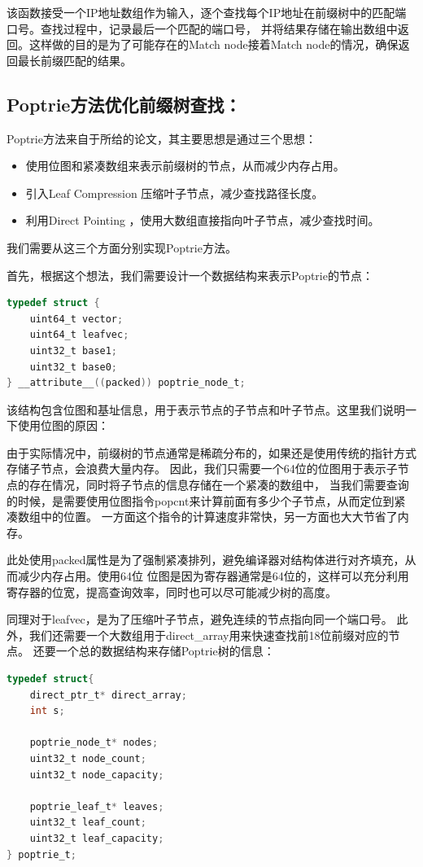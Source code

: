 \documentclass[11pt]{article}
\begin{document}
该函数接受一个IP地址数组作为输入，逐个查找每个IP地址在前缀树中的匹配端口号。查找过程中，记录最后一个匹配的端口号，
并将结果存储在输出数组中返回。这样做的目的是为了可能存在的Match node接着Match node的情况，确保返回最长前缀匹配的结果。

\subsection{Poptrie方法优化前缀树查找：}
Poptrie方法来自于所给的论文，其主要思想是通过三个思想：
\begin{itemize}
	\item 使用位图和紧凑数组来表示前缀树的节点，从而减少内存占用。
	\item 引入Leaf Compression 压缩叶子节点，减少查找路径长度。
	\item 利用Direct Pointing ，使用大数组直接指向叶子节点，减少查找时间。
\end{itemize}

我们需要从这三个方面分别实现Poptrie方法。

首先，根据这个想法，我们需要设计一个数据结构来表示Poptrie的节点：
\begin{lstlisting}[language=C]
typedef struct {
    uint64_t vector;
    uint64_t leafvec;
    uint32_t base1;
    uint32_t base0;
} __attribute__((packed)) poptrie_node_t;
\end{lstlisting}

该结构包含位图和基址信息，用于表示节点的子节点和叶子节点。这里我们说明一下使用位图的原因：

由于实际情况中，前缀树的节点通常是稀疏分布的，如果还是使用传统的指针方式存储子节点，会浪费大量内存。
因此，我们只需要一个64位的位图用于表示子节点的存在情况，同时将子节点的信息存储在一个紧凑的数组中，
当我们需要查询的时候，是需要使用位图指令popcnt来计算前面有多少个子节点，从而定位到紧凑数组中的位置。
一方面这个指令的计算速度非常快，另一方面也大大节省了内存。

此处使用packed属性是为了强制紧凑排列，避免编译器对结构体进行对齐填充，从而减少内存占用。使用64位
位图是因为寄存器通常是64位的，这样可以充分利用寄存器的位宽，提高查询效率，同时也可以尽可能减少树的高度。

同理对于leafvec，是为了压缩叶子节点，避免连续的节点指向同一个端口号。
此外，我们还需要一个大数组用于direct_array用来快速查找前18位前缀对应的节点。
还要一个总的数据结构来存储Poptrie树的信息：
\begin{lstlisting}[language=C]
typedef struct{
    direct_ptr_t* direct_array;
    int s;  

    poptrie_node_t* nodes;
    uint32_t node_count;
    uint32_t node_capacity;

    poptrie_leaf_t* leaves;
    uint32_t leaf_count;
    uint32_t leaf_capacity;
} poptrie_t;
\end{lstlisting}
\end{document}
